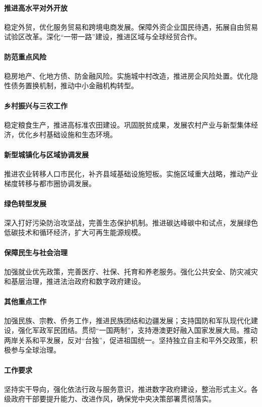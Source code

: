\paragraph{推进高水平对外开放}
稳定外贸，优化服务贸易和跨境电商发展。保障外资企业国民待遇，拓展自由贸易试验区改革。深化“一带一路”建设，推进区域与全球经贸合作。

\paragraph{防范重点风险}
稳房地产、化地方债、防金融风险。实施城中村改造，推进房企风险处置。优化隐性债务置换机制，推动中小金融机构转型。

\paragraph{乡村振兴与三农工作}
稳定粮食生产，推进高标准农田建设。巩固脱贫成果，发展农村产业与新型集体经济，优化乡村基础设施和生态环境。

\paragraph{新型城镇化与区域协调发展}
推进农业转移人口市民化，补齐县域基础设施短板。实施区域重大战略，推动产业梯度转移与都市圈协调发展。

\paragraph{绿色转型发展}
深入打好污染防治攻坚战，完善生态保护机制。推进碳达峰碳中和试点，发展绿色低碳技术和循环经济，扩大可再生能源规模。

\paragraph{保障民生与社会治理}
加强就业优先政策，完善医疗、社保、托育和养老服务。强化公共安全、防灾减灾和基层治理，推进法治政府和数字政府建设。

\paragraph{其他重点工作} 加强民族、宗教、侨务工作，推进民族团结和边疆发展；支持国防和军队现代化建设，强化军政军民团结。贯彻“一国两制”，支持港澳更好融入国家发展大局。推动两岸关系和平发展，反对“台独”，促进祖国统一。坚持独立自主和平外交政策，积极参与全球治理。

\paragraph{工作要求}
坚持实干导向，强化依法行政与服务意识，推进数字政府建设，整治形式主义。各级政府干部要提升能力、改进作风，确保党中央决策部署贯彻落实。


